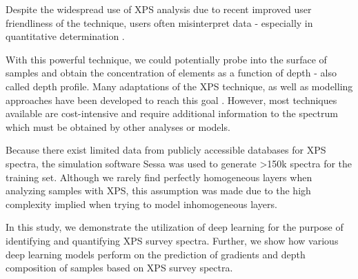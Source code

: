 
Despite the widespread use of XPS analysis due to recent improved user friendliness of the technique, users often misinterpret data - especially in quantitative determination \cite{shard_practical_2020}. 





With this powerful technique, we could potentially probe into the surface of samples and obtain the concentration of elements as a function of depth - also called depth profile. Many adaptations of the XPS technique, as well as modelling approaches have been developed to reach this goal \cite{zemek_non-destructive_2019, zborowski_improved_2022, zborowski_comparison_2022, noauthor_energy_2010}. However, most techniques available are cost-intensive and require additional information to the spectrum which must be obtained by other analyses or models.  




Because there exist limited data from publicly accessible databases for XPS spectra, the simulation software Sessa was used to generate >150k spectra for the training set. Although we rarely find perfectly homogeneous layers when analyzing samples with XPS, this assumption was made due to the high complexity implied when trying to model inhomogeneous layers.


In this study, we demonstrate the utilization of deep learning for the purpose of identifying and quantifying XPS survey spectra. Further, we show how various deep learning models perform on the prediction of gradients and depth composition of samples based on XPS survey spectra.

